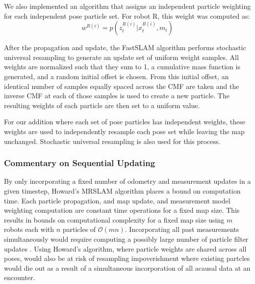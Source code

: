 We also implemented an algorithm that assigns an independent particle weighting for each independent pose particle set. For robot R, this weight was computed as:
$$w^{R(i)}=p(z_t^{R(i)}|x_t^{R(i)},m_t)$$

After the propagation and update, the FastSLAM algorithm performs stochastic universal resampling to generate an update set of uniform weight samples. All weights are normalized such that they sum to 1, a cumulative mass function is generated, and a random initial offset is chosen. From this initial offset, an identical number of samples equally spaced across the CMF are taken and the inverse CMF at each of those samples is used to create a new particle. The resulting weights of each particle are then set to a uniform value. 

For our addition where each set of pose particles has independent weights, these weights are used to independently resample each pose set while leaving the map unchanged. Stochastic universal resampling is also used for this process.
\vspace{0.1in}
\subsubsection{Commentary on Sequential Updating}
By only incorporating a fixed number of odometry and measurement updates in a given timestep, Howard's MRSLAM algorithm places a bound on computation time\cite{howard2006multi}. Each particle propagation, and map update, and measurement model weighting computation are constant time operations for a fixed map size. This results in bounds on computational complexity for a fixed map size using $m$ robots each with $n$ particles of $\mathcal{O}(mn)$. Incorporating all past measurements simultaneously would require computing a possibly large number of particle filter updates \cite{howard2006multi}. Using Howard's algorithm, where particle weights are shared across all poses, would also be at risk of resampling impoverishment where existing partcles would die out as a result of a simultaneous incorporation of all acausal data at an encounter.
